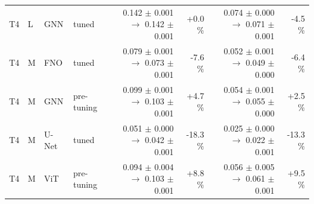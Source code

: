 \begin{table}[tb]
\begin{tabular}{llllrrrr}
T4 & L & GNN & tuned & 0.142 $\pm$ 0.001 $\rightarrow$ 0.142 $\pm$ 0.001 & +0.0 \% & 0.074 $\pm$ 0.000 $\rightarrow$ 0.071 $\pm$ 0.001 & -4.5 \% \\
T4 & M & FNO & tuned & 0.079 $\pm$ 0.001 $\rightarrow$ 0.073 $\pm$ 0.001 & -7.6 \% & 0.052 $\pm$ 0.001 $\rightarrow$ 0.049 $\pm$ 0.000 & -6.4 \% \\
T4 & M & GNN & pre-tuning & 0.099 $\pm$ 0.001 $\rightarrow$ 0.103 $\pm$ 0.001 & +4.7 \% & 0.054 $\pm$ 0.001 $\rightarrow$ 0.055 $\pm$ 0.000 & +2.5 \% \\
T4 & M & U-Net & tuned & 0.051 $\pm$ 0.000 $\rightarrow$ 0.042 $\pm$ 0.001 & -18.3 \% & 0.025 $\pm$ 0.000 $\rightarrow$ 0.022 $\pm$ 0.001 & -13.3 \% \\
T4 & M & ViT & pre-tuning & 0.094 $\pm$ 0.004 $\rightarrow$ 0.103 $\pm$ 0.001 & +8.8 \% & 0.056 $\pm$ 0.005 $\rightarrow$ 0.061 $\pm$ 0.001 & +9.5 \% \\
\bottomrule
\end{tabular}
\end{table}
